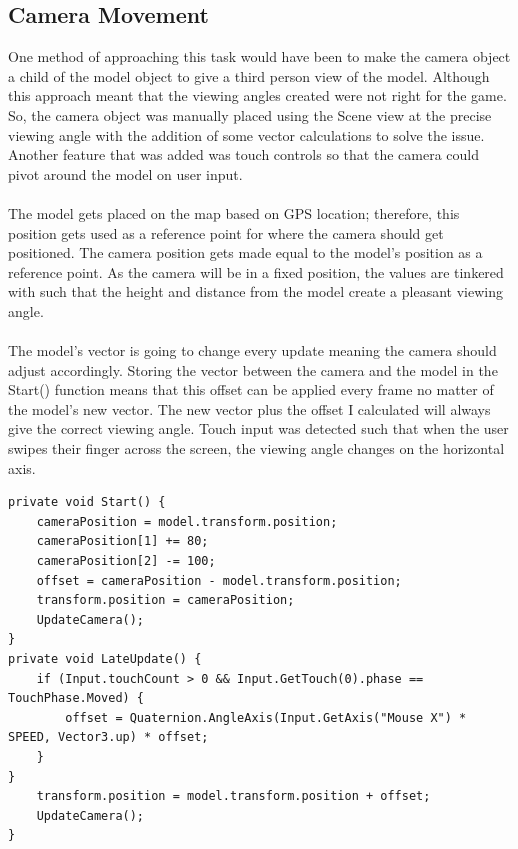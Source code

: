 \documentclass[a4paper]{report}
\begin{document}
\subsection{Camera Movement}
One method of approaching this task would have been to make the camera object a child of the model object to give a third person view of the model.
Although this approach meant that the viewing angles created were not right for the game. So, the camera object was manually placed using the Scene view at the precise viewing angle with the addition of some vector calculations to solve the issue. Another feature that was added was touch controls so that the camera could pivot around the model on user input.
\\\\
The model gets placed on the map based on GPS location; therefore, this position gets used as a reference point for where the camera should get positioned. The camera position gets made equal to the model's position as a reference point. As the camera will be in a fixed position, the values are tinkered with such that the height and distance from the model create a pleasant viewing angle.
\\\\ 
The model’s vector is going to change every update meaning the camera should adjust accordingly. Storing the vector between the camera and the model in the Start() function means that this offset can be applied every frame no matter of the model’s new vector. The new vector plus the offset I calculated will always give the correct viewing angle. Touch input was detected such that when the user swipes their finger across the screen, the viewing angle changes on the horizontal axis.
\begin{Verbatim}[tabsize=4]
private void Start() {
	cameraPosition = model.transform.position;
	cameraPosition[1] += 80;
	cameraPosition[2] -= 100;
	offset = cameraPosition - model.transform.position;
	transform.position = cameraPosition;
	UpdateCamera();
}
private void LateUpdate() {
	if (Input.touchCount > 0 && Input.GetTouch(0).phase == TouchPhase.Moved) {
		offset = Quaternion.AngleAxis(Input.GetAxis("Mouse X") * SPEED, Vector3.up) * offset;
	}
}
	transform.position = model.transform.position + offset;
	UpdateCamera();
}
\end{Verbatim}
\pagebreak
\end{document}
